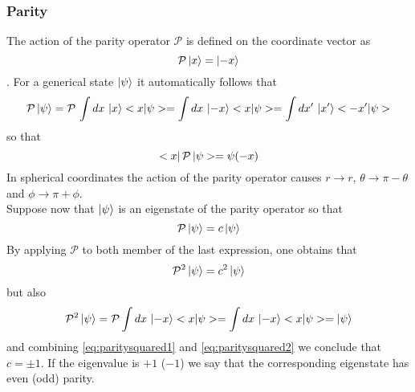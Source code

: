 \subsubsection*{Parity}
The action of the parity operator $\mathcal{P}$ is defined on the coordinate vector as $$ \mathcal{P} \left|{x}\right\rangle = \left|{-x}\right\rangle$$.
For a generical state $\left|{\psi}\right\rangle$ it automatically follows that 
\begin{equation*}
    \mathcal{P}\left|{\psi}\right\rangle = \mathcal{P} \, \int dx \, \left|{x}\right\rangle < {x} | {\psi} > = \int dx \, 
    \left|{-x}\right\rangle < {x} | {\psi} > = \int dx' \, \left|{x'}\right\rangle < {-x'} | {\psi} >
\end{equation*}
so that $$< {x} | \, {\mathcal{P}} \, | \psi > = \psi(-x)$$
In spherical coordinates the action of the parity operator causes 
$r \rightarrow r$, $\theta \rightarrow \pi - \theta$ and $\phi \rightarrow \pi + \phi$. \\
Suppose now that $\left|{\psi}\right\rangle$ is an eigenstate of the parity operator so that 
$$\mathcal{P} \left|{\psi}\right\rangle = c \left|{\psi}\right\rangle$$
By applying $\mathcal{P}$ to both member of the last expression, one obtains that
\begin{equation}
     \mathcal{P}^2 \left|{\psi}\right\rangle = c^2 \left|{\psi}\right\rangle
     \label{eq:paritysquared1}
\end{equation}
but also
\begin{equation}
    \mathcal{P}^2 \left|{\psi}\right\rangle = \mathcal{P} \int dx \, 
    \left|{-x}\right\rangle < {x} | {\psi} > = \int dx \, 
    \left|{-x}\right\rangle < {x} | {\psi} > = \left|{\psi}\right\rangle
    \label{eq:paritysquared2}
\end{equation}
and combining \ref{eq:paritysquared1} and \ref{eq:paritysquared2} we conclude that $c = \pm 1$.
If the eigenvalue is $+1$ ($-1$) we say that the corresponding eigenstate has even (odd) parity.